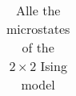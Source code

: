 \begin{table}[H]
	\caption{Alle the microstates of the $ 2\times 2  $ Ising model}
	\label{tab: mikro}
\begin{tabular}{cp{1cm}cc}
	
\end{tabular}
\end{table}